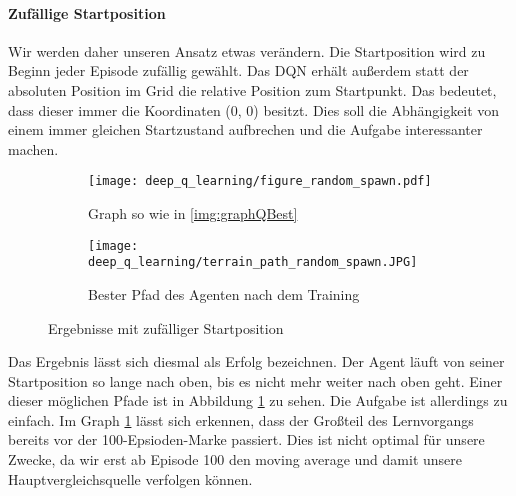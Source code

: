 \paragraph{Zufällige Startposition}
Wir werden daher unseren Ansatz etwas verändern. Die Startposition wird zu Beginn jeder Episode zufällig gewählt. Das DQN erhält außerdem statt der absoluten Position im Grid die relative Position zum Startpunkt. Das bedeutet, dass dieser immer die Koordinaten (0, 0) besitzt. Dies soll die Abhängigkeit von einem immer gleichen Startzustand aufbrechen und die Aufgabe interessanter machen.
\begin{figure}[h!]
    \centering
    \begin{subfigure}[b]{0.49\textwidth}
        \texttt{[image: deep\_q\_learning/figure\_random\_spawn.pdf]}
        \caption{Graph so wie in \ref{img:graphQBest}}
        \label{img:graphDeepQRandomSpawn}
    \end{subfigure}
    \begin{subfigure}[b]{0.49\textwidth}
        \texttt{[image: deep\_q\_learning/terrain\_path\_random\_spawn.JPG]}
        \caption{Bester Pfad des Agenten nach dem Training}
        \label{img:pathDeepQRandomSpawn}
    \end{subfigure}
    \caption{Ergebnisse mit zufälliger Startposition}
\end{figure}
Das Ergebnis lässt sich diesmal als Erfolg bezeichnen. Der Agent läuft von seiner Startposition so lange nach oben, bis es nicht mehr weiter nach oben geht. Einer dieser möglichen Pfade ist in Abbildung \ref{img:graphDeepQRandomSpawn} zu sehen. Die Aufgabe ist allerdings zu einfach. Im Graph \ref{img:graphDeepQRandomSpawn} lässt sich erkennen, dass der Großteil des Lernvorgangs bereits vor der 100-Epsioden-Marke passiert. Dies ist nicht optimal für unsere Zwecke, da wir erst ab Episode 100 den moving average und damit unsere Hauptvergleichsquelle verfolgen können.

